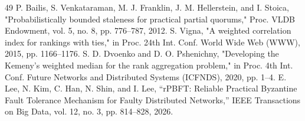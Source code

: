 \documentclass[11pt]{article}
\begin{document}
\begin{thebibliography}{49}
 P. Bailis, S. Venkataraman, M. J. Franklin, J. M. Hellerstein, and I. Stoica, "Probabilistically bounded staleness for practical partial quorums," Proc. VLDB Endowment, vol. 5, no. 8, pp. 776–787, 2012.
 S. Vigna, "A weighted correlation index for rankings with ties," in Proc. 24th Int. Conf. World Wide Web (WWW), 2015, pp. 1166–1176.
 S. D. Dvoenko and D. O. Pshenichny, "Developing the Kemeny's weighted median for the rank aggregation problem," in Proc. 4th Int. Conf. Future Networks and Distributed Systems (ICFNDS), 2020, pp. 1–4.
 E. Lee, N. Kim, C. Han, N. Shin, and I. Lee, “rPBFT: Reliable Practical Byzantine Fault Tolerance Mechanism for Faulty Distributed Networks,” IEEE Transactions on Big Data, vol. 12, no. 3, pp. 814–828, 2026.
\end{thebibliography}
\end{document}

